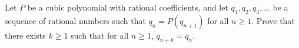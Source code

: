 Let $P$ be a cubic polynomial with rational coefficients, and let $q_{1},q_{2},q_{3},\ldots$ be a sequence of rational numbers such that $q_{n}=P(q_{n+1})$ for all $n \geq 1$. Prove that there exists $k \geq 1$ such that for all $n \geq 1$, $q_{n+k}=q_{n}$.
